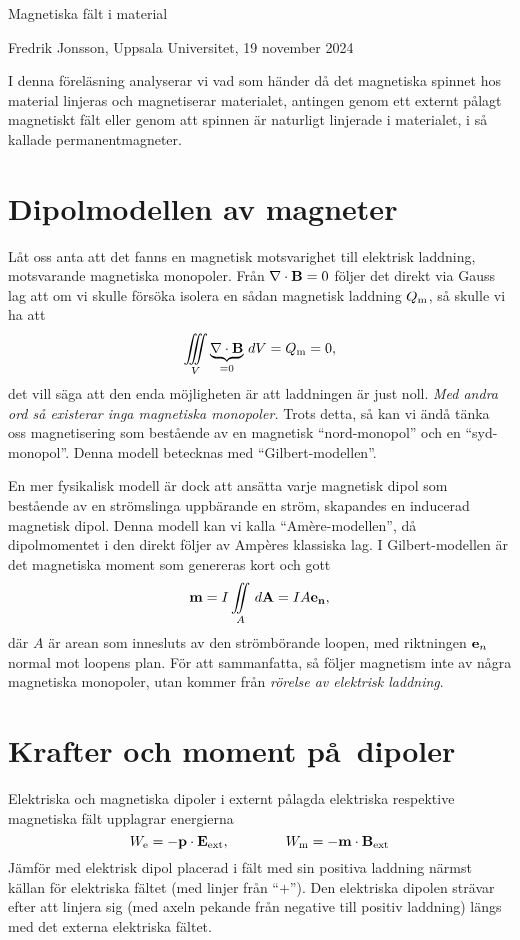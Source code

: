 \centerline{\twelvesc Magnetiska f\"alt i material}
\centerline{Fredrik Jonsson, Uppsala Universitet, 19 november 2024}
\vskip24pt
\noindent
I denna f{\"o}rel{\"a}sning analyserar vi vad som h{\"a}nder d{\aa} det
magnetiska spinnet hos material linjeras och magnetiserar materialet, antingen
genom ett externt p{\aa}lagt magnetiskt f{\"a}lt eller genom att spinnen {\"a}r
naturligt linjerade i materialet, i s{\aa} kallade permanentmagneter.

\section{Dipolmodellen av magneter}
L{\aa}t oss anta att det fanns en magnetisk motsvarighet till elektrisk
laddning, motsvarande magnetiska monopoler. Fr{\aa}n $\nabla\cdot{\bf B}=0$
f{\"o}ljer det direkt via Gauss lag att om vi skulle f{\"o}rs{\"o}ka isolera
en s{\aa}dan magnetisk laddning $Q_{\rm m}$, s{\aa} skulle vi ha att
$$
  \iiint_V\underbrace{\nabla\cdot{\bf B}}_{=0}\,dV=Q_{\rm m}=0,
$$
det vill s{\"a}ga att den enda m{\"o}jligheten {\"a}r att laddningen {\"a}r
just noll. {\it Med andra ord s{\aa} existerar inga magnetiska monopoler.}
Trots detta, s{\aa} kan vi {\"a}nd{\aa} t{\"a}nka oss magnetisering som
best{\aa}ende av en magnetisk ``nord-monopol'' och en ``syd-monopol''.
Denna modell betecknas med ``Gilbert-modellen''.
\medskip
\centerline{}
\medskip
\noindent
En mer fysikalisk modell {\"a}r dock att ans{\"a}tta varje magnetisk dipol som
best{\aa}ende av en str{\"o}mslinga uppb{\"a}rande en str{\"o}m, skapandes en
inducerad magnetisk dipol. Denna modell kan vi kalla ``Am\`ere-modellen'',
d{\aa} dipolmomentet i den direkt f{\"o}ljer av Amp\`eres klassiska lag.
I Gilbert-modellen {\"a}r det magnetiska moment som genereras kort och gott
$$
  {\bf m}=I\iint_A\,d{\bf A}=IA{\bf e}_{\bf n},
$$
d{\"a}r $A$ {\"a}r arean som innesluts av den str{\"o}mb{\"o}rande loopen, med
riktningen ${\bf e}_n$ normal mot loopens plan. F{\"o}r att sammanfatta, s{\aa}
f{\"o}ljer magnetism inte av n{\aa}gra magnetiska monopoler, utan kommer
fr{\aa}n {\it r{\"o}relse av elektrisk laddning}.
\vfill\eject
\section{Krafter och moment p\aa\ dipoler}
Elektriska och magnetiska dipoler i externt p{\aa}lagda elektriska respektive
magnetiska f{\"a}lt upplagrar energierna
$$
  W_{\rm e} = -{\bf p}\cdot{\bf E}_{\rm ext},\qquad\qquad
  W_{\rm m} = -{\bf m}\cdot{\bf B}_{\rm ext}
$$
J{\"a}mf{\"o}r med elektrisk dipol placerad i f{\"a}lt med sin positiva
laddning n{\"a}rmst k{\"a}llan f{\"o}r elektriska f{\"a}ltet (med linjer
fr{\aa}n ``$+$''). Den elektriska dipolen str{\"a}var efter att linjera sig
(med axeln pekande fr{\aa}n negative till positiv laddning) l{\"a}ngs med
det externa elektriska f{\"a}ltet.

